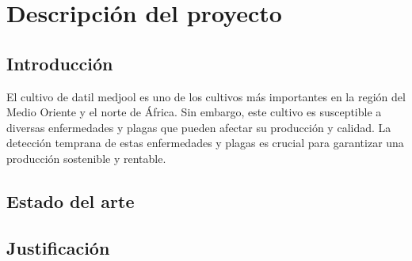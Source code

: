 
\chapter{Descripción del proyecto} %

\label{Chapter1} %


\newcommand{\keyword}[1]{\textbf{#1}}
\newcommand{\tabhead}[1]{\textbf{#1}}
\newcommand{\code}[1]{\texttt{#1}}
\newcommand{\file}[1]{\texttt{\bfseries#1}}
\newcommand{\option}[1]{\texttt{\itshape#1}}


\section{Introducción}

El cultivo de datil medjool es uno de los cultivos más importantes en la región del Medio Oriente y el norte de África. Sin embargo, este cultivo es susceptible a diversas enfermedades y plagas que pueden afectar su producción y calidad. La detección temprana de estas enfermedades y plagas es crucial para garantizar una producción sostenible y rentable.\\


\section{Estado del arte}


\section{Justificación}
